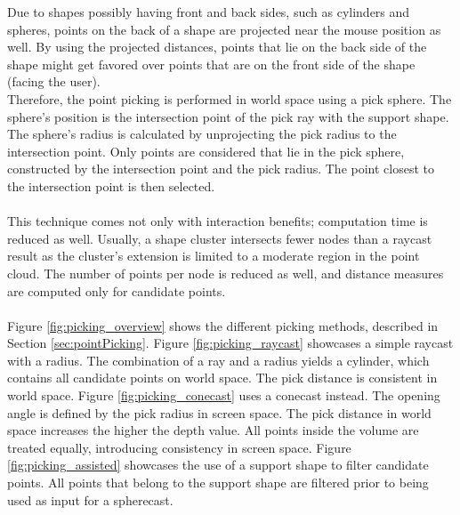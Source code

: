 Due to shapes possibly having front and back sides, such as cylinders and spheres, points on the back of a shape are projected near the mouse position as well. By using the projected distances, points that lie on the back side of the shape might get favored over points that are on the front side of the shape (facing the user). 
\\
Therefore, the point picking is performed in world space using a pick sphere. The sphere's position is the intersection point of the pick ray with the support shape. The sphere's radius is calculated by unprojecting the pick radius to the intersection point. Only points are considered that lie in the pick sphere, constructed by the intersection point and the pick radius. The point closest to the intersection point is then selected. 
\\
\\
This technique comes not only with interaction benefits; computation time is reduced as well. Usually, a shape cluster intersects fewer nodes than a raycast result as the cluster's extension is limited to a moderate region in the point cloud. The number of points per node is reduced as well, and distance measures are computed only for candidate points. 
\\
\\
Figure \ref{fig:picking_overview} shows the different picking methods, described in Section \ref{sec:pointPicking}. Figure \ref{fig:picking_raycast} showcases a simple raycast with a radius. The combination of a ray and a radius yields a cylinder, which contains all candidate points on world space. The pick distance is consistent in world space. Figure \ref{fig:picking_conecast} uses a conecast instead. The opening angle is defined by the pick radius in screen space. The pick distance in world space increases the higher the depth value. All points inside the volume are treated equally, introducing consistency in screen space. Figure \ref{fig:picking_assisted} showcases the use of a support shape to filter candidate points. All points that belong to the support shape are filtered prior to being used as input for a spherecast. 

